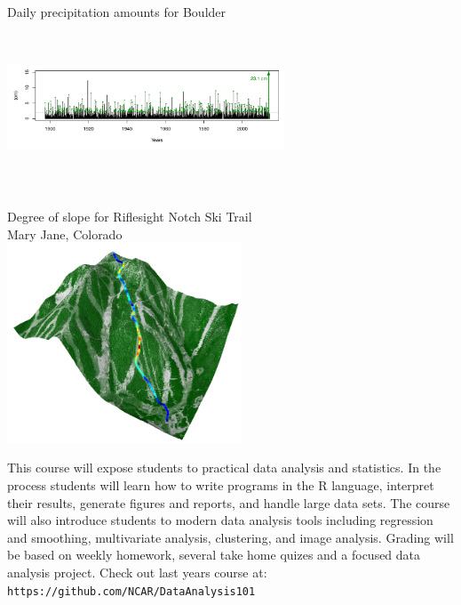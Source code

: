 \documentclass[12pt]{article}
\begin{document}
{\begin{minipage}[t]{3.75in}
\vspace*{0in}
\hspace*{.25in} 
Daily precipitation amounts  for Boulder \\
\includegraphics[width=3.25in, height=2in]{Boulder1.pdf} 
\end{minipage}
\begin{minipage}[t]{3.75in}
\vspace*{0in}
Degree of slope for Riflesight Notch Ski Trail \\
Mary Jane, Colorado  \\
\includegraphics[width=2.75in]{slopeimage3.png}
\end{minipage}
%
{
This course will expose students to practical data analysis and statistics. In the process students will learn how to 
 write programs in the R language, interpret their results,  generate figures and reports, and handle large data sets. 
 The course will also introduce students to  modern data analysis tools including 
regression and smoothing, multivariate analysis, clustering,  and image analysis. Grading will be based on weekly homework, 
several take home quizes and a focused data analysis project.  Check out last years course at: \verb+https://github.com/NCAR/DataAnalysis101+ 
}
}
\end{document}
